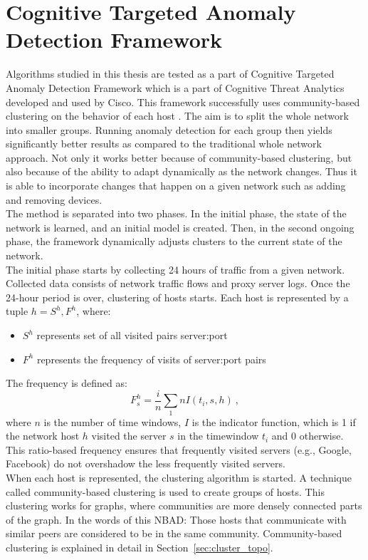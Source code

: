 \documentclass[thesis=B,english]{FITthesis}[2012/10/20]
\begin{document}
\section{Cognitive Targeted Anomaly Detection Framework}\label{sec:ctadf}

Algorithms studied in this thesis are tested as a part of Cognitive Targeted Anomaly Detection Framework which is a part of Cognitive Threat Analytics developed and used by Cisco.
This framework successfully uses community-based clustering on the behavior of each host \cite{kopp2018community}.
The aim is to split the whole network into smaller groups.
Running anomaly detection for each group then yields significantly better results as compared to the traditional whole network approach.
Not only it works better because of community-based clustering, but also because of the ability to adapt dynamically as the network changes.
Thus it is able to incorporate changes that happen on a given network such as adding and removing devices.\\

The method is separated into two phases.
In the initial phase, the state of the network is learned, and an initial model is created.
Then, in the second ongoing phase, the framework dynamically adjusts clusters to the current state of the network. \\

The initial phase starts by collecting 24 hours of traffic from a given network.
Collected data consists of network traffic flows and proxy server logs.
Once the 24-hour period is over, clustering of hosts starts.
Each host is represented by a tuple $h = {S^h, F^h}$, where:
\begin{itemize}
    \item $S^h$ represents set of all visited pairs server:port
    \item $F^h$ represents the frequency of visits of server:port pairs
\end{itemize}
The frequency is defined as:
$$F_s^h = \frac{i}{n}\sum\limits_{1}{n}I(t_i, s, h)\:,$$ where $n$ is the number of time windows, $I$ is the indicator function, which is 1 if the network host $h$ visited the server $s$ in the timewindow $t_i$ and 0 otherwise.
This ratio-based frequency ensures that frequently visited servers (e.g., Google, Facebook) do not overshadow the less frequently visited servers.\\

When each host is represented, the clustering algorithm is started.
A technique called community-based clustering is used to create groups of hosts.
This clustering works for graphs, where communities are more densely connected parts of the graph.
In the words of this NBAD: Those hosts that communicate with similar peers are considered to be in the same community.
Community-based clustering is explained in detail in Section~\ref{sec:cluster_topo}.\\
\end{document}
